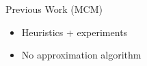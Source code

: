 \begin{frame}{Previous Work (MCM)}
\begin{itemize}
  \item<1> Heuristics + experiments
  \item<2> No approximation algorithm
\end{itemize}
\end{frame}